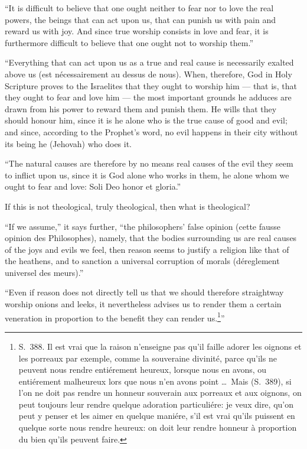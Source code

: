 \documentclass[12pt,a4paper]{article}
\begin{document}
``It is difficult to believe that one ought neither to fear nor to love the real
powers, the beings that can act upon us, that can punish us with pain and reward
us with joy. And since true worship consists in love and fear, it is furthermore
difficult to believe that one ought not to worship them.''

``Everything that can act upon us as a true and real cause is necessarily exalted
above us (est nécessairement au dessus de nous). When, therefore, God in Holy
Scripture proves to the Israelites that they ought to worship him --- that is, that
they ought to fear and love him --- the most important grounds he adduces are drawn
from his power to reward them and punish them.
He wills that they should honour him, since it is he alone who is the true cause of
good and evil; and since, according to the Prophet's word, no evil happens in
their city without its being he (Jehovah) who does it.

``The natural causes are therefore by no means real causes of the evil they seem
to inflict upon us, since it is God alone who works in them, he alone whom we ought
to fear and love: Soli Deo honor et gloria.''

If this is not theological, truly theological, then what is theological?

``If we assume,'' it says further, ``the philosophers' false opinion (cette fausse
opinion des Philosophes), namely, that the bodies surrounding us are real causes of
the joys and evils we feel, then reason seems to justify a religion like that of
the heathens, and to sanction a universal corruption of morals (déreglement
universel des meurs).''

``Even if reason does not directly tell us that we should therefore straightway
worship onions and leeks, it nevertheless advises us to render them a certain
veneration in proportion to the benefit they can render us.\footnote{S.~388. Il est
vrai que la raison n'enseigne pas qu'il faille adorer les oignons et les porreaux
par exemple, comme la souveraine divinité, parce qu'ils ne peuvent nous rendre
entiérement heureux, lorsque nous en avons, ou entiérement malheureux lors que
nous n'en avons point \dots\ Mais (S.~389), si l'on ne doit pas rendre un honneur
souverain aux porreaux et aux oignons, on peut toujours leur rendre quelque
adoration particuliére: je veux dire, qu'on peut y penser et les aimer en quelque
maniére, s'il est vrai qu'ils puissent en quelque sorte nous rendre heureux: on
doit leur rendre honneur à proportion du bien qu'ils peuvent faire.}''
\end{document}
